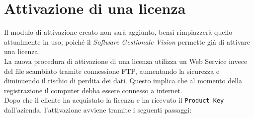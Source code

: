 \section{Attivazione di una licenza}
Il modulo di attivazione creato non sarà aggiunto, bensì rimpiazzerà quello attualmente in uso, poiché il \textit{Software Gestionale Vision} permette già di attivare una licenza.\\
La nuova procedura di attivazione di una licenza utilizza un Web Service invece del file scambiato tramite connessione FTP, aumentando la sicurezza e diminuendo il rischio di perdita dei dati. Questo implica che al momento della registrazione il computer debba essere connesso a internet.\\
Dopo che il cliente ha acquistato la licenza e ha ricevuto il \texttt{Product Key} dall'azienda, l'attivazione avviene tramite i seguenti passaggi:
